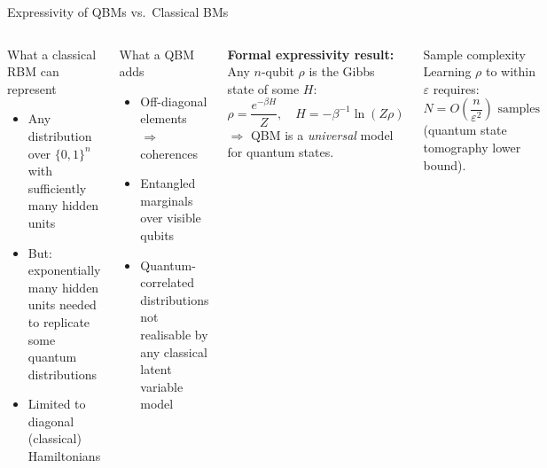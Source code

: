\documentclass[aspectratio=169,10pt]{beamer}
\begin{document}
\begin{frame}{Expressivity of QBMs vs.\ Classical BMs}
  \begin{columns}[T]
      \begin{block}{What a classical RBM can represent}
        \begin{itemize}\itemsep0pt
          \item Any distribution over $\{0,1\}^n$
                with sufficiently many hidden units
          \item But: exponentially many hidden units needed
                to replicate some quantum distributions
          \item Limited to diagonal (classical) Hamiltonians
        \end{itemize}
      \end{block}
      \vspace{0.08cm}
      \begin{alertblock}{What a QBM adds}
        \begin{itemize}\itemsep0pt
          \item Off-diagonal elements $\Rightarrow$ coherences
          \item Entangled marginals over visible qubits
          \item Quantum-correlated distributions not realisable
                by any classical latent variable model
        \end{itemize}
      \end{alertblock}
      \textbf{Formal expressivity result:}
      Any $n$-qubit $\rho$ is the Gibbs state of some $H$:
      \[
        \rho = \frac{e^{-\beta H}}{Z},\quad
        H = -\beta^{-1}\ln(Z\rho)
      \]
      $\Rightarrow$ QBM is a \emph{universal} model for
      quantum states.
      \vspace{0.1cm}
      \begin{block}{Sample complexity}
        Learning $\rho$ to within $\varepsilon$ requires:
        \[
          N = O\!\left(\frac{n}{\varepsilon^2}\right)
          \text{ samples}
        \]
        (quantum state tomography lower bound).
      \end{block}
  \end{columns}
\end{frame}
\end{document}
